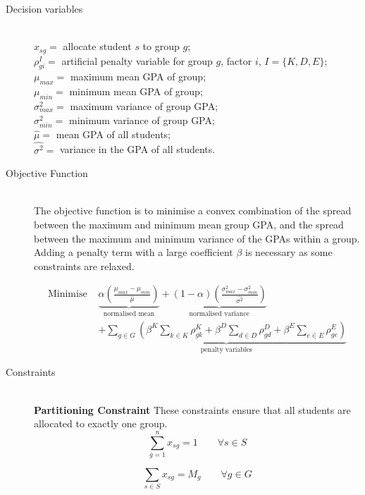 \documentclass[12pt]{ORSNZ}
\begin{document}
\begin{description}
\item[Decision variables]\mbox{} \\
$x_{sg} = $ allocate student $s$ to group $g$;\\
$\rho^I_{gi} = $ artificial penalty variable for group $g$, factor $i$, \qquad $I=\{K, D, E\}$;\\
$\mu_{max} = $ maximum mean GPA of group;\\
$\mu_{min} = $ minimum mean GPA of group;\\
$\sigma^2_{max} = $ maximum variance of group GPA;\\
$\sigma^2_{min} = $  minimum variance of group GPA;\\
$\hat{\mu} = $ mean GPA of all students;\\
$\hat{\sigma^2} = $ variance in the GPA of all students.


\item[Objective Function]\mbox{} \\
The objective function is to minimise a convex combination of the spread between the maximum and minimum mean group GPA, and the spread between the maximum and minimum variance of the GPAs within a group. Adding a penalty term with a large coefficient $\beta$ is necessary as some constraints are relaxed.


\begin{equation}\begin{split}
\mbox{Minimise }&
\underbrace{\alpha\left(\frac{\mu_{max} - \mu_{min}}{\hat{\mu}}\right)}_{\mbox{normalised mean}} 
+ \underbrace{(1-\alpha)\left(\frac{\sigma^2_{max} - \sigma^2_{min}}{\hat{\sigma^2}}\right)}_{\mbox{normalised variance}}
\\&+ \underbrace{\sum_{g \in G}\left(\beta^K\sum_{k \in K}\rho^K_{gk} 
	+ \beta^D\sum_{d \in D}\rho^D_{gd} 
	+ \beta^E\sum_{e \in E}\rho^E_{ge}\right)}_{\mbox{penalty variables}}
\end{split}\end{equation}

\item[Constraints]\mbox{} \\
\textbf{Partitioning Constraint} These constraints ensure that all students are allocated to exactly one group.
\begin{equation} \label{con1}
\sum_{g=1}^n x_{sg} =  1 \qquad \mbox{$\forall s \in S$}
\end{equation}

\begin{equation} \label{con2}
\sum_{s \in S} x_{sg} =  M_g \qquad \mbox{$\forall g \in G$}
\end{equation}


\end{description}
\end{document}
